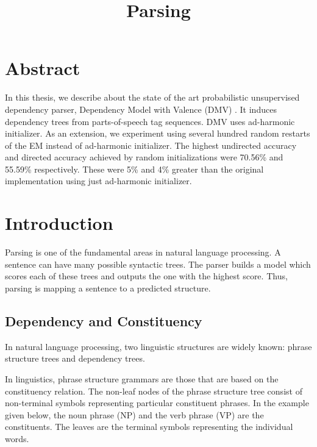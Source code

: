 \documentclass{book}
\title{Parsing}
\begin{document}
\chapter*{\centering Abstract}
\begin{quotation}
\noindent %
\end{quotation}

In this thesis, we describe about the state of the art probabilistic unsupervised dependency parser, Dependency Model with Valence (DMV) \citep{klein2004}. It induces dependency trees from parts-of-speech tag sequences. DMV uses ad-harmonic initializer. As an extension, we experiment using several hundred random restarts of the EM instead of ad-harmonic initializer. The highest undirected accuracy and directed accuracy achieved by random initializations were 70.56\% and 55.59\% respectively. These were 5\% and 4\% greater than the original implementation using just ad-harmonic initializer.


\let\cleardoublepage\clearpage

\chapter{Introduction}


Parsing is one of the fundamental areas in natural language processing. A sentence can have many possible syntactic trees. The parser builds a model which scores each of these trees and outputs the one with the highest score. Thus, parsing is mapping a sentence to a predicted structure.

\section{Dependency and Constituency}

In natural language processing, two linguistic structures are widely known: phrase structure trees and dependency trees.

  In linguistics, phrase structure grammars are those that are based on the constituency relation. The non-leaf nodes of the phrase structure tree consist of non-terminal symbols representing particular constituent phrases. In the example given below, the noun phrase (NP) and the verb phrase (VP) are the constituents. The leaves are the terminal symbols representing the individual words.
\end{document}
